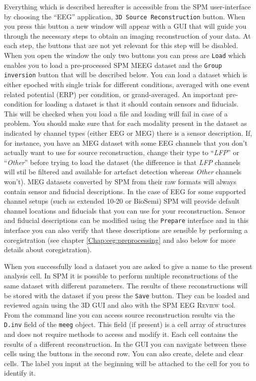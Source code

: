 Everything which is described hereafter is accessible from the SPM user-interface by choosing the ``EEG'' application, \texttt{3D Source Reconstruction} button. When you press this button a new window will appear with a GUI that will guide you through the necessary steps to obtain an imaging reconstruction of your data. At each step, the buttons that are not yet relevant for this step will be disabled. When you open the window the only two buttons you can press are \texttt{Load} which enables you to load a pre-processed SPM MEEG dataset and the \texttt{Group inversion} button that will be described below. You can load a dataset which is either epoched with single trials for different conditions, averaged with one event related potential (ERP) per condition, or grand-averaged. An important pre-condition for loading a dataset is that it should contain sensors and fiducials. This will be checked when you load a file and loading will fail in case of a problem. You should make sure that for each modality present in the dataset as indicated by channel types (either EEG or MEG) there is a sensor description. If, for instance, you have an MEG dataset with some EEG channels that you don't actually want to use for source reconstruction, change their type to ``\textit{LFP}'' or ``\textit{Other}'' before trying to load the dataset (the difference is that \textit{LFP} channels will stil be filtered and available for artefact detection whereas \textit{Other} channels won't). MEG datasets converted by SPM from their raw formats will always contain sensor and fiducial descriptions. In the case of EEG for some supported channel setups (such as extended 10-20 or BioSemi) SPM will provide default channel locations and fiducials that you can use for your reconstruction. Sensor and fiducial descriptions can be modified using the \texttt{Prepare} interface and in this interface you can also verify that these descriptions are sensible by performing a coregistration (see chapter \ref{Chap:eeg:preprocessing} and also below for more details about coregistration).

When you successfully load a dataset you are asked to give a name to the present analysis cell. In SPM it is possible to perform multiple reconstructions of the same dataset with different parameters. The results of these reconstructions will be stored with the dataset if you press the \texttt{Save} button. They can be loaded and reviewed again using the 3D GUI and also with the SPM EEG \textsc{Review} tool. From the command line you can access source reconstruction results via the \texttt{D.inv} field of the \texttt{meeg} object. This field (if present) is a cell array of structures and does not require methods to access and modify it. Each cell contains the results of a different reconstruction. In the GUI you can navigate between these cells using the buttons in the second row. You can also create, delete and clear cells. The label you input at the beginning will be attached to the cell for you to identify it.


